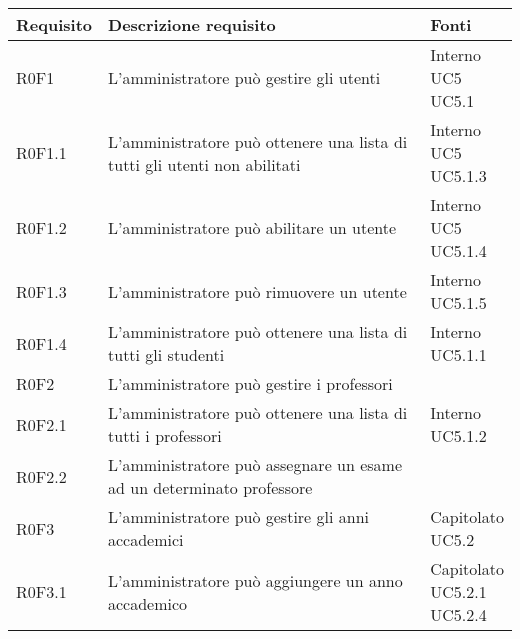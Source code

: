 \documentclass[AnalisiDeiRequisiti.tex]{subfiles}
\begin{document}
\label{table:Tabella di tracciamento requisiti-fonti}
\renewcommand*{\arraystretch}{1.2}
\begin{longtable}[H]{p{2cm}p{5.2cm}p{5cm}}
	\rowcolor{CHeader} 
	\color{CHeaderText} \textbf{Requisito} & \color{CHeaderText} \textbf{Descrizione requisito} & \color{CHeaderText} \textbf{Fonti} \\  
	\endhead
	R0F1 &  L'amministratore può gestire gli utenti & \makecell[tl]{
		Interno \\
		UC5 \\
		UC5.1
	} \\  
	R0F1.1 &  L'amministratore può ottenere una lista di tutti gli utenti non abilitati & \makecell[tl]{
		Interno \\ 
		UC5 \\  
		UC5.1.3
	} \\  
	R0F1.2 &  L'amministratore può abilitare un utente & \makecell[tl]{
		Interno \\ 
		UC5 \\ 
		UC5.1.4
	} \\  
	R0F1.3 &  L'amministratore può rimuovere un utente & \makecell[tl]{
		Interno \\ 
		UC5.1.5
	} \\  
	R0F1.4 &  L'amministratore può ottenere una lista di tutti gli studenti & \makecell[tl]{
		Interno \\  
		UC5.1.1
	} \\  
	R0F2 &  L'amministratore può gestire i professori & \makecell[tl]{
		Interno
	} \\  
	R0F2.1 &  L'amministratore può ottenere una lista di tutti i professori & \makecell[tl]{
		Interno \\ 
		UC5.1.2 
	} \\  
	R0F2.2 &  L'amministratore può assegnare un esame ad un determinato professore & \makecell[tl]{
		Capitolato
	} \\  
	R0F3 &  L'amministratore può gestire gli anni accademici & \makecell[tl]{
		Capitolato \\ 
		UC5.2
	} \\  
	R0F3.1 &  L'amministratore può aggiungere un anno accademico & \makecell[tl]{
		Capitolato \\ 
		UC5.2.1 \\ 
		UC5.2.4 \\ 
}
\end{longtable}
\end{document}
